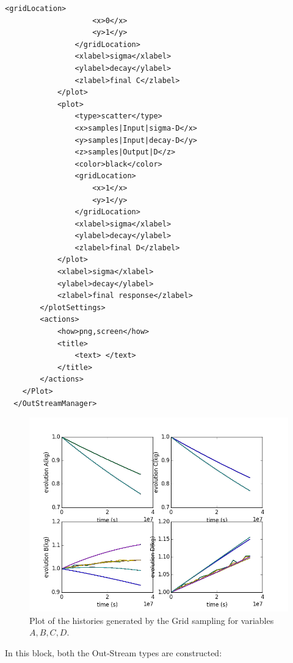 \begin{enumerate}
\begin{lstlisting}[style=XML,morekeywords={arg,extension,pauseAtEnd,overwrite}]
                <gridLocation>
                    <x>0</x>
                    <y>1</y>
                </gridLocation>
                <xlabel>sigma</xlabel>
                <ylabel>decay</ylabel>
                <zlabel>final C</zlabel>
            </plot>
            <plot>
                <type>scatter</type>
                <x>samples|Input|sigma-D</x>
                <y>samples|Input|decay-D</y>
                <z>samples|Output|D</z>
                <color>black</color>
                <gridLocation>
                    <x>1</x>
                    <y>1</y>
                </gridLocation>
                <xlabel>sigma</xlabel>
                <ylabel>decay</ylabel>
                <zlabel>final D</zlabel>
            </plot>
            <xlabel>sigma</xlabel>
            <ylabel>decay</ylabel>
            <zlabel>final response</zlabel>
        </plotSettings>
        <actions>
            <how>png,screen</how>
            <title>
                <text> </text>
            </title>
        </actions>
    </Plot>
  </OutStreamManager>
\end{lstlisting}
 \begin{figure}[h!]
  \centering
  \includegraphics[scale=0.7]{pics/Grid_histories.png}
  \caption{Plot of the histories generated by the Grid sampling for variables $A,B,C,D$.}
  \label{fig:historiesGridPlotLine}
 \end{figure}
  In this block, both the Out-Stream types are constructed: 
  \begin{itemize}

\end{itemize}
\end{enumerate}
